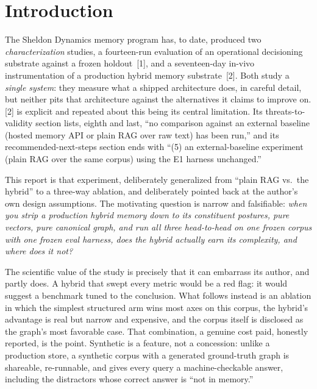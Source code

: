 \documentclass[11pt]{article}
\begin{document}
\section{Introduction}
The Sheldon Dynamics memory program has, to date, produced two \emph{characterization}
studies, a fourteen-run evaluation of an operational decisioning substrate against a frozen
holdout~[1], and a seventeen-day in-vivo instrumentation of a production hybrid memory
substrate~[2]. Both study a \emph{single system}: they measure what a shipped architecture
does, in careful detail, but neither pits that architecture against the alternatives it
claims to improve on. [2] is explicit and repeated about this being its central limitation.
Its threats-to-validity section lists, eighth and last, ``no comparison against an external
baseline (hosted memory API or plain RAG over raw text) has been run,'' and its
recommended-next-steps section ends with ``(5) an external-baseline experiment (plain RAG
over the same corpus) using the E1 harness unchanged.''

This report is that experiment, deliberately generalized from ``plain RAG vs.\ the hybrid''
to a three-way ablation, and deliberately pointed back at the author's own design
assumptions. The motivating question is narrow and falsifiable: \emph{when you strip a
production hybrid memory down to its constituent postures, pure vectors, pure canonical
graph, and run all three head-to-head on one frozen corpus with one frozen eval harness,
does the hybrid actually earn its complexity, and where does it not?}

The scientific value of the study is precisely that it can embarrass its author, and partly
does. A hybrid that swept every metric would be a red flag: it would suggest a benchmark
tuned to the conclusion. What follows instead is an ablation in which the simplest structured
arm wins most axes on this corpus, the hybrid's advantage is real but narrow and expensive,
and the corpus itself is disclosed as the graph's most favorable case. That combination, a
genuine cost paid, honestly reported, is the point. Synthetic is a feature, not a
concession: unlike a production store, a synthetic corpus with a generated ground-truth
graph is shareable, re-runnable, and gives every query a machine-checkable answer, including
the distractors whose correct answer is ``not in memory.''
\end{document}
